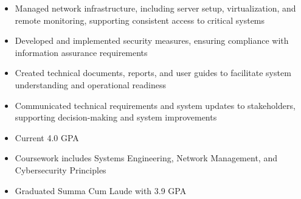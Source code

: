 \par\smallskip
\noindent
\begin{minipage}{20cm}
  \begin{minipage}{9.75cm}
    \begin{itemize}
      \item Managed network infrastructure, including server setup, virtualization, and remote monitoring, supporting consistent access to critical systems
      \item Developed and implemented security measures, ensuring compliance with information assurance requirements
    \end{itemize}
  \end{minipage}
  \hfill
  \begin{minipage}{9.75cm}
    \begin{itemize}
      \item Created technical documents, reports, and user guides to facilitate system understanding and operational readiness
      \item Communicated technical requirements and system updates to stakeholders, supporting decision-making and system improvements
    \end{itemize}
  \end{minipage}
\end{minipage}

\begin{itemize}
  \item Current 4.0 GPA
  \item Coursework includes Systems Engineering, Network Management, and Cybersecurity Principles
\end{itemize}
\divider

\begin{itemize}
  \item Graduated Summa Cum Laude with 3.9 GPA
\end{itemize}

\noindent
\begin{minipage}{20cm}
\end{minipage}


